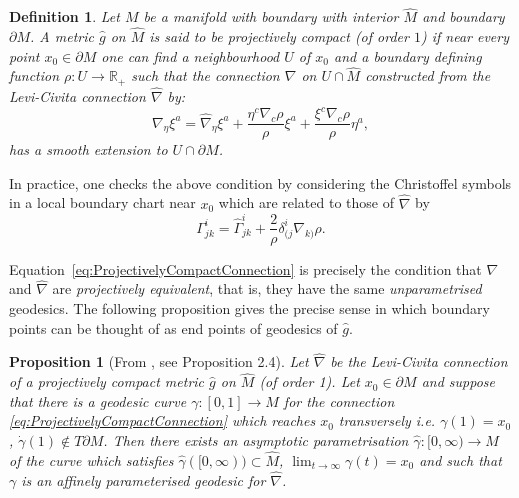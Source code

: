 \documentclass[a4paper, 10pt]{article}
\newtheorem{definition}{Definition}[section]
\newtheorem{proposition}{Proposition}[section]
\theoremstyle{remark}
\newcommand{\R}{\mathbb{R}}
\newcommand{\pa}{\partial} %
\begin{document}
\begin{definition}
Let $M$ be a manifold with boundary with interior $\hat{M}$ and boundary $\partial M$. A metric $\hat{g}$ on $\hat{M}$ is said to be projectively compact (of order $1$) if near every point $x_0\in \partial M$ one can find a neighbourhood $U$ of $x_0$ and a boundary defining function $\rho: U\rightarrow \R_+$ such that the connection $\nabla$ on $U\cap \hat{M}$  constructed from the Levi-Civita connection $\hat\nabla$  by: 
\begin{equation}\label{eq:ProjectivelyCompactConnection}
\nabla_\eta \xi^a = \hat\nabla_\eta \xi^a + \frac{\eta^c\nabla_c\rho}{\rho}\xi^a + \frac{\xi^c\nabla_c\rho}{\rho}\eta^a, \end{equation}
has a smooth extension to $U\cap \pa M$. 
\end{definition}
 In practice, one checks the above condition by considering the Christoffel symbols in a local boundary chart near $x_0$ which are related to those of $\hat{\nabla}$ by
\begin{equation}\label{eq:ProjectivelyCompactConnection, christofel}
    \Gamma^i_{jk}=\hat\Gamma^{i}_{jk} + \frac{2}{\rho}\delta^i_{(j}\nabla_{k)}\rho.
\end{equation}


Equation~\eqref{eq:ProjectivelyCompactConnection} is precisely the condition that $\nabla$ and $\hat{\nabla}$ are \emph{projectively equivalent}, that is, they have the same \emph{unparametrised} geodesics. The following proposition gives the precise sense in which boundary points can be thought of as end points of geodesics of $\hat{g}$.
\begin{proposition}[{From \cite{Cap:2014aa}, see Proposition 2.4}] Let $\hat\nabla$ be the Levi-Civita connection of a projectively compact metric $\hat{g}$ on $\hat{M}$ (of order 1). Let $x_0\in\partial M$ and suppose that there is a geodesic curve  $\gamma : [0, 1] \rightarrow M$ for the connection \eqref{eq:ProjectivelyCompactConnection} which reaches $x_0$ transversely i.e. $\gamma(1)=x_0$, $\dot{\gamma}(1) \notin T\partial M$. Then there exists an asymptotic parametrisation $\hat{\gamma} : [0, \infty) \rightarrow M$ of the curve which satisfies $\hat{\gamma}([0, \infty)) \subset \hat M$,  $\displaystyle \lim_{t\to \infty} \gamma(t) = x_0$ and such that $\gamma$ is an affinely parameterised geodesic for $\hat\nabla$.\end{proposition}
\end{document}

